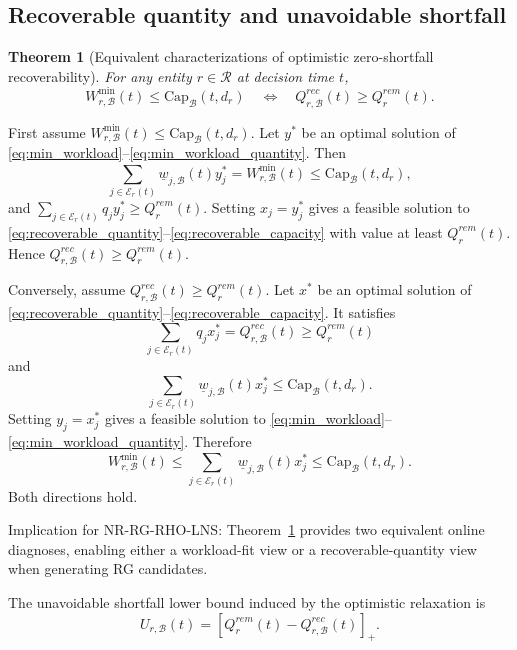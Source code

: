 \documentclass[a4paper,fleqn]{cas-sc}
\newtheorem{theorem}{Theorem}
\begin{document}
\subsection{Recoverable quantity and unavoidable shortfall}
\label{sec:recoverable_shortfall}

\begin{theorem}[Equivalent characterizations of optimistic zero-shortfall recoverability]
\label{thm:dual_knapsack}
For any entity \(r\in\mathcal R\) at decision time \(t\),
\begin{equation}
W_{r,\mathcal B}^{\min}(t)\le \mathrm{Cap}_{\mathcal B}(t,d_r)
\quad\Longleftrightarrow\quad
Q_{r,\mathcal B}^{rec}(t)\ge Q_r^{rem}(t).
\label{eq:dual_knapsack_equivalence}
\end{equation}
\end{theorem}

\begin{pf}
First assume \(W_{r,\mathcal B}^{\min}(t)\le \mathrm{Cap}_{\mathcal B}(t,d_r)\). Let \(y^*\) be an optimal solution of \eqref{eq:min_workload}--\eqref{eq:min_workload_quantity}. Then
\[
\sum_{j\in\mathcal E_r(t)}
\underline w_{j,\mathcal B}(t)y_j^*
=
W_{r,\mathcal B}^{\min}(t)
\le
\mathrm{Cap}_{\mathcal B}(t,d_r),
\]
and \(\sum_{j\in\mathcal E_r(t)}q_jy_j^*\ge Q_r^{rem}(t)\). Setting \(x_j=y_j^*\) gives a feasible solution to \eqref{eq:recoverable_quantity}--\eqref{eq:recoverable_capacity} with value at least \(Q_r^{rem}(t)\). Hence \(Q_{r,\mathcal B}^{rec}(t)\ge Q_r^{rem}(t)\).

Conversely, assume \(Q_{r,\mathcal B}^{rec}(t)\ge Q_r^{rem}(t)\). Let \(x^*\) be an optimal solution of \eqref{eq:recoverable_quantity}--\eqref{eq:recoverable_capacity}. It satisfies
\[
\sum_{j\in\mathcal E_r(t)}q_jx_j^*
=Q_{r,\mathcal B}^{rec}(t)
\ge Q_r^{rem}(t)
\]
and
\[
\sum_{j\in\mathcal E_r(t)}
\underline w_{j,\mathcal B}(t)x_j^*
\le
\mathrm{Cap}_{\mathcal B}(t,d_r).
\]
Setting \(y_j=x_j^*\) gives a feasible solution to \eqref{eq:min_workload}--\eqref{eq:min_workload_quantity}. Therefore
\[
W_{r,\mathcal B}^{\min}(t)
\le
\sum_{j\in\mathcal E_r(t)}
\underline w_{j,\mathcal B}(t)x_j^*
\le
\mathrm{Cap}_{\mathcal B}(t,d_r).
\]
Both directions hold.
\end{pf}

Implication for NR-RG-RHO-LNS: Theorem~\ref{thm:dual_knapsack} provides two equivalent online diagnoses, enabling either a workload-fit view or a recoverable-quantity view when generating RG candidates.

The unavoidable shortfall lower bound induced by the optimistic relaxation is
\begin{equation}
U_{r,\mathcal B}(t)=
[Q_r^{rem}(t)-Q_{r,\mathcal B}^{rec}(t)]_+.
\label{eq:unavoidable_shortfall}
\end{equation}
\end{document}
